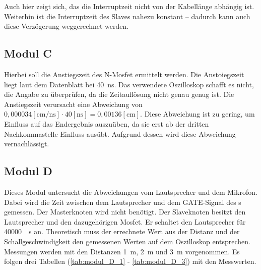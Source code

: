 Auch hier zeigt sich, das die Interruptzeit nicht von der Kabellänge abhängig ist. Weiterhin ist die Interruptzeit des Slaves nahezu konstant -- dadurch kann auch diese Verzögerung weggerechnet werden. 

\subsection{Modul C}
Hierbei soll die Anstiegszeit des N-Mosfet ermittelt werden. Die Anstoiegszeit liegt laut dem Datenblatt bei \SI{40}{\nano\s}. Das verwendete Oszilloskop schafft es nicht, die Angabe zu überprüfen, da die Zeitauflösung nicht genau genug ist. Die Anstiegszeit verursacht eine Abweichung von $\si{0,000034}[\si{\centi\m\per\nano\s}] \cdot \si{40} [\si{\nano\s}] = \si{0,00136} [\si{\centi\m}]$. Diese Abweichung ist zu gering, um Einfluss auf das Endergebnis auszuüben, da sie erst ab der dritten Nachkommastelle Einfluss ausübt. Aufgrund dessen wird diese Abweichung vernachlässigt.

\subsection{Modul D}
Dieses Modul untersucht die Abweichungen vom Lautsprecher und dem Mikrofon. Dabei wird die Zeit zwischen dem Lautsprecher und dem \si{GATE}-Signal des \microphone s \platz gemessen. Der Masterknoten wird nicht benötigt. Der Slaveknoten besitzt den Lautsprecher und den dazugehörigen Mosfet. Er schaltet den Lautsprecher für \SI{40000}{\mu\s} an. Theoretisch muss der errechnete Wert aus der Distanz und der Schallgeschwindigkeit den gemessenen Werten auf dem Oszilloskop entsprechen. Messungen werden mit den Distanzen \SI{1}{m}, \SI{2}{m} und \SI{3}{m} vorgenommen. Es folgen drei Tabellen (\ref{tab:modul_D_1} - \ref{tab:modul_D_3}) mit den Messwerten. 


